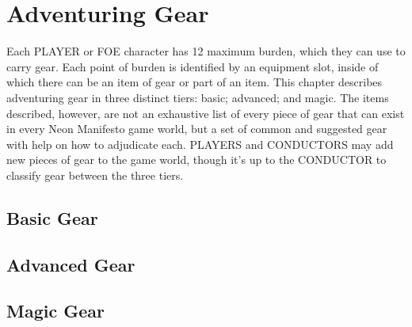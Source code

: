 \section{Adventuring Gear}
Each PLAYER or FOE character has 12 maximum burden, which they can use to carry gear. Each point of burden is identified by an equipment slot, inside of which there can be an item of gear or part of an item. This chapter describes adventuring gear in three distinct tiers: basic; advanced; and magic. The items described, however, are not an exhaustive list of every piece of gear that can exist in every Neon Manifesto game world, but a set of common and suggested gear with help on how to adjudicate each. PLAYERS and CONDUCTORS may add new pieces of gear to the game world, though it's up to the CONDUCTOR to classify gear between the three tiers.

\subsection{Basic Gear}
\begin{multicols}{2}
\end{multicols}

\subsection{Advanced Gear}
\begin{multicols}{2}
\end{multicols}

\subsection{Magic Gear}
\begin{multicols}{2}
\end{multicols}
